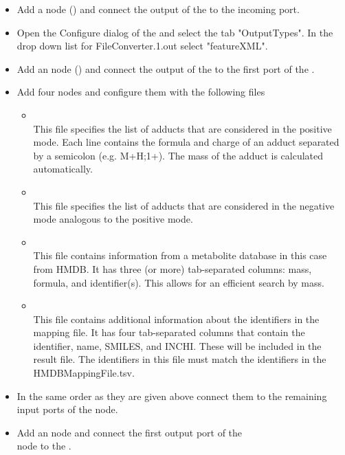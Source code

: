 \begin{itemize}
\item
Add a  node () and connect the output of the  to the incoming port.
\item
Open the Configure dialog of the  and select the tab "OutputTypes".
In the drop down list for FileConverter.1.out select "featureXML".
\item
Add an  node () and connect the output of the  to the first port of the .
\item
Add four  nodes and configure them with the following files
\begin{itemize}
\item
{}\\
This file specifies the list of adducts that are considered in the positive mode. Each line contains the formula and charge of an adduct separated by a semicolon (e.g. M+H;1+). The mass of the adduct is calculated automatically.
\item
{}\\
This file specifies the list of adducts that are considered in the negative mode analogous to the positive mode.
\item
{}\\
This file contains information from a metabolite database in this case from HMDB. It has three (or more) tab-separated columns: mass, formula, and identifier(s). This allows for an efficient search by mass.
\item
{}\\
This file contains additional information about the identifiers in the mapping file. It has four tab-separated columns that contain the identifier, name, SMILES, and INCHI. These will be included in the result file. The identifiers in this file must match the identifiers in the HMDBMappingFile.tsv.
\end{itemize}
\item
In the same order as they are given above connect them to the remaining input ports of the  node.
\item
Add an  node and connect the first output port of the \\
 node to the .
\end{itemize}

